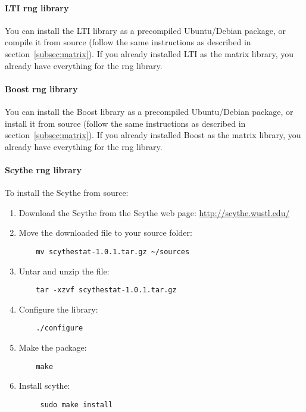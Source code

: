 \documentclass[a4paper,10pt]{article}
\begin{document}
\paragraph{LTI rng library}
You can install the LTI library as a precompiled Ubuntu/Debian
package, or compile it from source (follow the same instructions as
described in section~\ref{subsec:matrix}). If you already installed LTI
as the matrix library, you already have everything for the rng library.

\paragraph{Boost rng library}
You can install the Boost library as a precompiled Ubuntu/Debian
package, or install it from source (follow the same instructions as
described in section~\ref{subsec:matrix}). If you already installed Boost
as the matrix library, you already have everything for the rng library.

\paragraph{Scythe rng library}
To install the Scythe from source:
\begin{enumerate}
\item Download the Scythe from the Scythe web page:
  \url{http://scythe.wustl.edu/}
\item Move the downloaded file to your source folder:
	\begin{verbatim}
	mv scythestat-1.0.1.tar.gz ~/sources
	\end{verbatim}
\item Untar and unzip the file:
	\begin{verbatim}
	tar -xzvf scythestat-1.0.1.tar.gz
	\end{verbatim}
\item Configure the library:
	\begin{verbatim}
	./configure
	\end{verbatim}
\item Make the package:
	\begin{verbatim}
	make
	\end{verbatim}
\item Install scythe:
	\begin{verbatim}
	 sudo make install
	\end{verbatim}
\end{enumerate}
\end{document}
